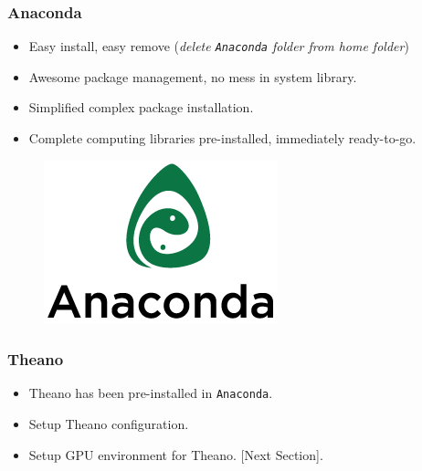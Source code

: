 \documentclass{beamer}
\begin{document}
\begin{frame}[fragile]
\frametitle{Anaconda}

\begin{minipage}{0.6\textwidth}
\begin{itemize}
\item[\checkmark] Easy install, easy remove ({\small \emph{delete \texttt{Anaconda} folder from home folder}})
\item[\checkmark] Awesome package management, no mess in system library.
\item[\checkmark] Simplified complex package installation. 
\item[\checkmark] Complete computing libraries pre-installed, immediately ready-to-go.
\end{itemize}
\end{minipage}
\begin{minipage}{0.35\textwidth}
\begin{figure}
  \includegraphics[width=\textwidth]{anaconda_logo.png}
\end{figure}
\end{minipage}

\end{frame}

\begin{frame}[fragile]
\frametitle{Theano}

\begin{itemize}
\item[\checkmark] Theano has been pre-installed in \texttt{Anaconda}.
\item[\ding{112}] Setup Theano configuration.
\item[\ding{112}] Setup GPU environment for Theano. [Next Section].
\end{itemize}

\end{frame}
\end{document}
